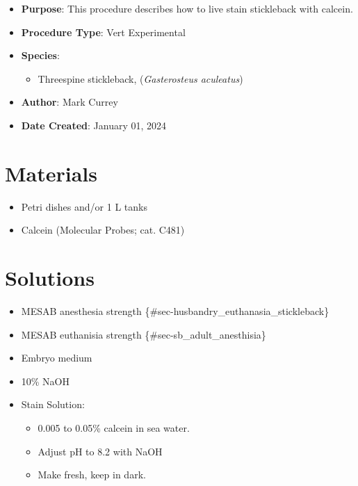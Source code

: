 \documentclass[
  letterpaper,
  DIV=11,
  numbers=noendperiod]{scrreprt}
\providecommand{\tightlist}{%
  \setlength{\itemsep}{0pt}\setlength{\parskip}{0pt}}\usepackage{longtable,booktabs,array}
\begin{document}
\begin{itemize}
\tightlist
\item
  \textbf{Purpose}: This procedure describes how to live stain
  stickleback with calcein.
\item
  \textbf{Procedure Type}: Vert Experimental
\item
  \textbf{Species}:

  \begin{itemize}
  \tightlist
  \item
    Threespine stickleback, (\emph{Gasterosteus aculeatus})
  \end{itemize}
\item
  \textbf{Author}: Mark Currey
\item
  \textbf{Date Created}: January 01, 2024
\end{itemize}

\hypertarget{materials-50}{%
\section{Materials}\label{materials-50}}

\begin{itemize}
\tightlist
\item
  Petri dishes and/or 1 L tanks
\item
  Calcein (Molecular Probes; cat. C481)
\end{itemize}

\hypertarget{solutions-47}{%
\section{Solutions}\label{solutions-47}}

\begin{itemize}
\tightlist
\item
  MESAB anesthesia strength \{\#sec-husbandry\_euthanasia\_stickleback\}
\item
  MESAB euthanisia strength \{\#sec-sb\_adult\_anesthisia\}
\item
  Embryo medium
\item
  10\% NaOH
\item
  Stain Solution:

  \begin{itemize}
  \tightlist
  \item
    0.005 to 0.05\% calcein in sea water.
  \item
    Adjust pH to 8.2 with NaOH
  \item
    Make fresh, keep in dark.
  \end{itemize}
\end{itemize}
\end{document}
